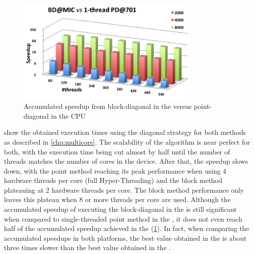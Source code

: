 \documentclass[../thesis]{subfiles}
\begin{document}
	\begin{figure}[t]
		\centering
		\begin{minipage}{0.7\textwidth}
			\centering
			\includegraphics[width=0.8\textwidth]{assets/images/mic/mic-cpu-speedup-accumulated.png}
			\captionsetup{font=small}
			\caption{Accumulated speedup from block-diagonal in the \intel\xeonphi versus point-diagonal in the \acs{CPU}}
			\label{fig:mic:mic-cpu:speedup:accumulated}
		\end{minipage}
	\end{figure}

	 show the obtained execution times using the diagonal strategy for both methods as described in \cref{chp:multicore}. The scalability of the algorithm is near perfect for both, with the execution time being cut almost by half until the number of threads matches the number of cores in the device. After that, the speedup slows down, with the point method reaching its peak performance when using 4 hardware threads per core (full Hyper-Threading) and the block method plateauing at 2 hardware threads per core. The block method performance only leaves this plateau when 8 or more threads per core are used.
	Although the accumulated speedup of executing the block-diagonal in the \intel\xeonphi is still significant when compared to single-threaded point method in the \cpu, it does not even reach half of the accumulated speedup achieved in the \cpu (\cref{fig:mic:mic-cpu:speedup:accumulated}). In fact, when comparing the accumulated speedups in both platforms, the best value obtained in the \intel\xeonphi is about three times slower than the best value obtained in the \cpu.
\end{document}
